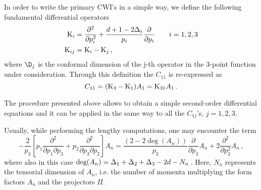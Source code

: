 \documentclass[a4paper,11pt,openright,twoside]{book}
\numberwithin{equation}{section}
\begin{document}
{{{\begin{equation}
		\label{eq:C11quasi}  
	\end{equation}
	In order to write the primary CWI's in a simple way, we define the following fundamental differential operators
	\begin{equation}
		\begin{split}
			\textup{K}_i &= \frac{\partial^2}{\partial p_i^2} + \frac{d+1-2\Delta_i}{p_i} \frac{\partial}{\partial p_i}  \qquad i=1,2,3    \\ 
			\textup{K}_{ij} &= \textup{K}_i - \textup{K}_j \,,
		\end{split}\label{Koper}
	\end{equation}
	where $\D_j$ is the conformal dimension of the j-th operator in the 3-point function under consideration. Through this definition the $C_{11}$ is re-expressed as
	\begin{equation}
		C_{11} = (\textup{K}_3 - \textup{K}_1 ) A_1 = \textup{K}_{31}A_1 \,.
	\end{equation}
	
	The procedure presented above allows to obtain a simple second-order differential equations and it can be applied in the same way to all the $C_{1j}$'s, $j=1,2,3$. 
	
	Usually, while performing the lengthy computations, one may encounter the term
	\begin{equation}
		-\frac{2}{p_3}  \left[ p_1 \frac{\partial^2}{\partial p_1 \partial p_3} +  p_2 \frac{\partial^2}{\partial p_3 \partial p_2}  \right]  A_n = \frac{\left( 2 - 2 \deg(A_n) \right)}{p_3} \frac{\partial}{\partial p_3} A_n +2  \frac{\partial^2}{\partial p_3^2} A_n \,,
	\end{equation}
	where also in this case $\textup{deg}(A_n)= \Delta_1 + \Delta_2+ \Delta_3 -2 d - N_n \,$.
	Here, $N_n$ represents the tensorial dimension of $A_n$, i.e. the number of momenta multiplying the form factors $A_n$ and the projectors $\Pi$. 
	
}}}
\end{document}
